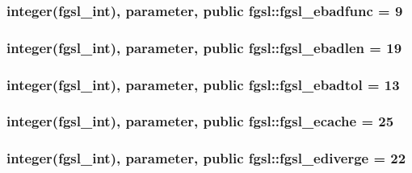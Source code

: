 \hypertarget{classfgsl_aee7266f310ad4022066e6fe82eecc0f9}{
\subsubsection[{fgsl\-\_\-ebadfunc}]{\setlength{\rightskip}{0pt plus 5cm}integer({\bf fgsl\-\_\-int}), parameter, public fgsl\-::fgsl\-\_\-ebadfunc = 9}}\label{classfgsl_aee7266f310ad4022066e6fe82eecc0f9}
\hypertarget{classfgsl_ac1f16c63f7a3d224fceb2113566856f5}{
\subsubsection[{fgsl\-\_\-ebadlen}]{\setlength{\rightskip}{0pt plus 5cm}integer({\bf fgsl\-\_\-int}), parameter, public fgsl\-::fgsl\-\_\-ebadlen = 19}}\label{classfgsl_ac1f16c63f7a3d224fceb2113566856f5}
\hypertarget{classfgsl_a3df3fe39582721655da00574f4b021d1}{
\subsubsection[{fgsl\-\_\-ebadtol}]{\setlength{\rightskip}{0pt plus 5cm}integer({\bf fgsl\-\_\-int}), parameter, public fgsl\-::fgsl\-\_\-ebadtol = 13}}\label{classfgsl_a3df3fe39582721655da00574f4b021d1}
\hypertarget{classfgsl_aa9ace1ec026e9acd65806d63c8b6e649}{
\subsubsection[{fgsl\-\_\-ecache}]{\setlength{\rightskip}{0pt plus 5cm}integer({\bf fgsl\-\_\-int}), parameter, public fgsl\-::fgsl\-\_\-ecache = 25}}\label{classfgsl_aa9ace1ec026e9acd65806d63c8b6e649}
\hypertarget{classfgsl_a955eb5c7585781ffb9e336843a471566}{
\subsubsection[{fgsl\-\_\-ediverge}]{\setlength{\rightskip}{0pt plus 5cm}integer({\bf fgsl\-\_\-int}), parameter, public fgsl\-::fgsl\-\_\-ediverge = 22}}\label{classfgsl_a955eb5c7585781ffb9e336843a471566}
